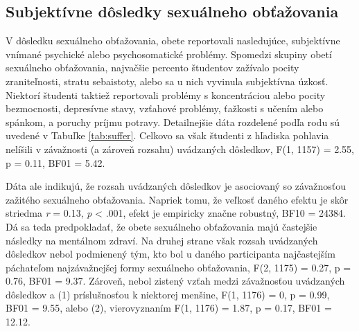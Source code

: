 \documentclass[
]{article}
\begin{document}
\begin{table}[H]

\caption{\label{tab:whereTable}Miesto sexuálneho obťažovania}
\centering
{}
\end{table}

\hypertarget{subjektuxedvne-duxf4sledky-sexuuxe1lneho-obux165aux17eovania}{%
\subsection{Subjektívne dôsledky sexuálneho obťažovania}\label{subjektuxedvne-duxf4sledky-sexuuxe1lneho-obux165aux17eovania}}

V dôsledku sexuálneho obťažovania, obete reportovali nasledujúce, subjektívne vnímané psychické alebo psychosomatické problémy. Spomedzi skupiny obetí sexuálneho obťažovania, najvačšie percento študentov zažívalo pocity zraniteľnosti, stratu sebaistoty, alebo sa u nich vyvinula subjektívna úzkosť. Niektorí študenti taktiež reportovali problémy s koncentráciou alebo pocity bezmocnosti, depresívne stavy, vzťahové problémy, ťažkosti s učením alebo spánkom, a poruchy príjmu potravy. Detailnejšie dáta rozdelené podľa rodu sú uvedené v Tabuľke \ref{tab:suffer}. Celkovo sa však študenti z hľadiska pohlavia nelíšili v závažnosti (a zároveň rozsahu) uvádzaných dôsledkov, F(1, 1157) = 2.55, p = 0.11, BF01 = 5.42.

Dáta ale indikujú, že rozsah uvádzaných dôsledkov je asociovaný so závažnosťou zažitého sexuálneho obťažovania. Napriek tomu, že veľkosť daného efektu je skôr striedma \emph{r} = 0.13, \emph{p} \textless{} .001, efekt je empiricky značne robustný, BF10 = 24384. Dá sa teda predpokladať, že obete sexuálneho obťažovania majú častejšie následky na mentálnom zdraví. Na druhej strane však rozsah uvádzaných dôsledkov nebol podmienený tým, kto bol u daného participanta najčastejším páchateľom najzávažnejšej formy sexuálneho obťažovania, F(2, 1175) = 0.27, p = 0.76, BF01 = 9.37. Zároveň, nebol zistený vzťah medzi závažnosťou uvádzaných dôsledkov a (1) príslušnosťou k niektorej menšine, F(1, 1176) = 0, p = 0.99, BF01 = 9.55, alebo (2), vierovyznaním F(1, 1176) = 1.87, p = 0.17, BF01 = 12.12.
\end{document}
